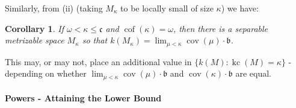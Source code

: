 \documentclass{article}
\newtheorem{cor}[thm]{Corollary}
\DeclareMathOperator{\cof}{cof}
\begin{document}
Similarly, from (ii) (taking $M_\kappa$ to be locally small of size $\kappa$) we have:
\begin{cor}
    If $\omega < \kappa \le \mathfrak{c}$ and $\cof(\kappa)=\omega$, then there is a separable metrizable space $M_\kappa$ so that $k(M_\kappa)=\lim_{\mu < \kappa} \mathop{cov}(\mu)\cdot\mathfrak{b}$.
\end{cor}
This may, or may not, place an additional value in $\{k(M) : \mathop{kc}(M)=\kappa\}$ - depending on whether $\lim_{\mu < \kappa} \mathop{cov}(\mu)\cdot\mathfrak{b}$ and $\mathop{cov}(\kappa)\cdot\mathfrak{b}$ are equal.


\paragraph{Powers - Attaining the Lower Bound} 
\end{document}
